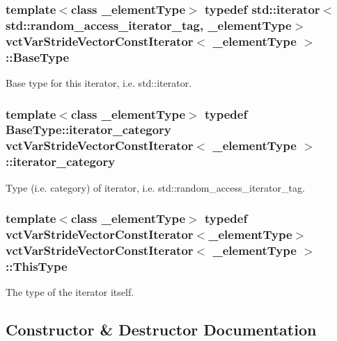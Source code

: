 \subsubsection[{Base\+Type}]{\setlength{\rightskip}{0pt plus 5cm}template$<$class \+\_\+element\+Type$>$ typedef std\+::iterator$<$std\+::random\+\_\+access\+\_\+iterator\+\_\+tag, \+\_\+element\+Type$>$ {\bf vct\+Var\+Stride\+Vector\+Const\+Iterator}$<$ \+\_\+element\+Type $>$\+::{\bf Base\+Type}}\label{classvct_var_stride_vector_const_iterator_aff6a833a060e9e88031f459ab4380d1e}
Base type for this iterator, i.\+e. std\+::iterator. \hypertarget{classvct_var_stride_vector_const_iterator_ab2fdb1f3617d3ac621e096e4a447694a}{}
\subsubsection[{iterator\+\_\+category}]{\setlength{\rightskip}{0pt plus 5cm}template$<$class \+\_\+element\+Type$>$ typedef Base\+Type\+::iterator\+\_\+category {\bf vct\+Var\+Stride\+Vector\+Const\+Iterator}$<$ \+\_\+element\+Type $>$\+::{\bf iterator\+\_\+category}}\label{classvct_var_stride_vector_const_iterator_ab2fdb1f3617d3ac621e096e4a447694a}
Type (i.\+e. category) of iterator, i.\+e. std\+::random\+\_\+access\+\_\+iterator\+\_\+tag. \hypertarget{classvct_var_stride_vector_const_iterator_afd99aad7dc756d227f4fb02cd569d00a}{}
\subsubsection[{This\+Type}]{\setlength{\rightskip}{0pt plus 5cm}template$<$class \+\_\+element\+Type$>$ typedef {\bf vct\+Var\+Stride\+Vector\+Const\+Iterator}$<$\+\_\+element\+Type$>$ {\bf vct\+Var\+Stride\+Vector\+Const\+Iterator}$<$ \+\_\+element\+Type $>$\+::{\bf This\+Type}}\label{classvct_var_stride_vector_const_iterator_afd99aad7dc756d227f4fb02cd569d00a}
The type of the iterator itself. 

\subsection{Constructor \& Destructor Documentation}
\hypertarget{classvct_var_stride_vector_const_iterator_af97b14def571ce0ee2b489d93a28e7b0}{}
